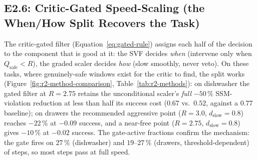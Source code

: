\documentclass[11pt,a4paper]{report}
\newcommand{\ssm}{SSM}
\begin{document}
\subsection{E2.6: Critic-Gated Speed-Scaling (the When/How Split Recovers the Task)}
\label{sec:results:r2-gated}

The critic-gated filter (Equation~\ref{eq:gated-rule}) assigns each
half of the decision to the component that is good at it: the SVF
decides \emph{when} (intervene only when $Q_{\mathrm{safe}} < R$),
the graded scaler decides \emph{how} (slow smoothly, never veto).
On these tasks, where genuinely-safe windows exist for the critic to
find, the split works
(Figure~\ref{fig:r2-method-comparison},
Table~\ref{tab:r2-methods}): on dishwasher the gated filter at
$R = 2.75$ retains the unconditional scaler's \emph{full} $-50\,\%$
\ssm{}-violation reduction at less than half its success cost
($0.67$ vs.\ $0.52$, against a $0.77$ baseline); on drawers the
recommended aggressive point ($R = 3.0$, $d_{\mathrm{slow}} = 0.8$)
reaches $-22\,\%$ at $-0.09$ success, and a near-free point
($R = 2.75$, $d_{\mathrm{slow}} = 0.8$) gives $-10\,\%$ at $-0.02$
success. The gate-active fractions confirm the mechanism: the gate
fires on $27\,\%$ (dishwasher) and $19$--$27\,\%$ (drawers,
threshold-dependent) of steps, so most steps pass at full speed.
\end{document}
